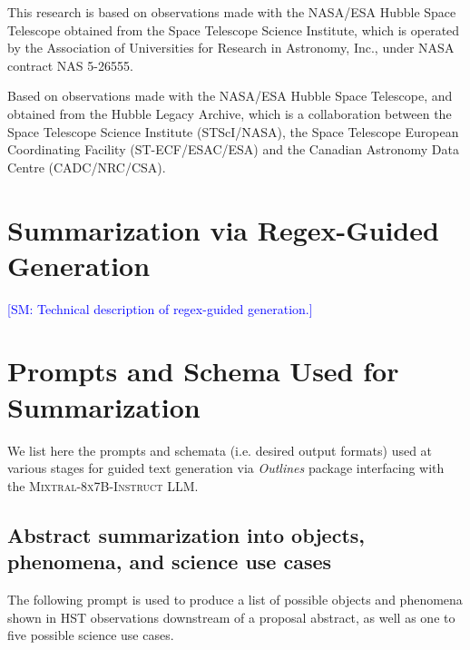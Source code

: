 \documentclass[10pt]{article} %
\newcommand{\package}[1]{\textsl{#1}\xspace}
\newcommand{\SM}[1]{\textcolor{blue}{[SM: #1]}}
\begin{document}
This research is based on observations made with the NASA/ESA Hubble Space Telescope obtained from the Space Telescope Science Institute, which is operated by the Association of Universities for Research in Astronomy, Inc., under NASA contract NAS 5-26555.

Based on observations made with the NASA/ESA Hubble Space Telescope, and obtained from the Hubble Legacy Archive, which is a collaboration between the Space Telescope Science Institute (STScI/NASA), the Space Telescope European Coordinating Facility (ST-ECF/ESAC/ESA) and the Canadian Astronomy Data Centre (CADC/NRC/CSA).





\appendix
\section{Summarization via Regex-Guided Generation}
\label{app:guided-generation}

\SM{Technical description of regex-guided generation.}

\section{Prompts and Schema Used for Summarization}
\label{app:prompts}

We list here the prompts and schemata (i.e. desired output formats) used at various stages for guided text generation via \package{Outlines} package interfacing with the \textsc{Mixtral-8x7B-Instruct} LLM.

\subsection{Abstract summarization into objects, phenomena, and science use cases}
\label{app:summarization}

The following prompt is used to produce a list of possible objects and phenomena shown in HST observations downstream of a proposal abstract, as well as one to five possible science use cases.
\end{document}
